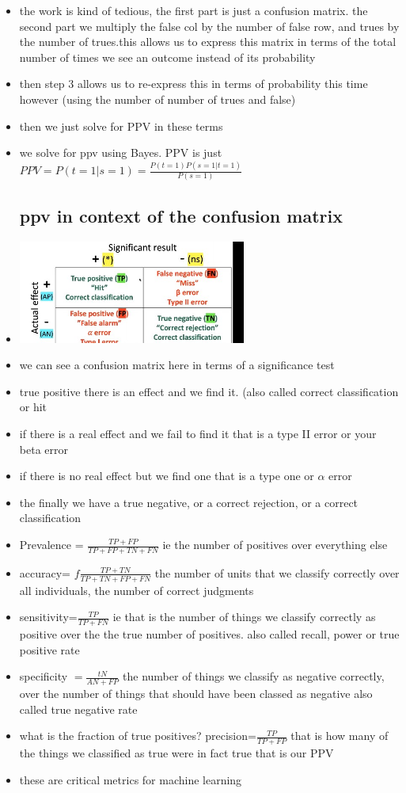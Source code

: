 \documentclass{article}
\begin{document}
\begin{itemize}
\item the work is kind of tedious, the first part is just a confusion matrix. the second part we multiply the false col by the number of false row, and trues by the number of trues.this allows us to express this matrix in terms of the total number of times we see an outcome instead of its probability
\item then step 3 allows us to re-express this in terms of probability this time however (using the number of number of trues and false) 
\item then we just solve for PPV in these terms 
\item we solve for ppv using Bayes. PPV is just $PPV=P(t=1|s=1)=\frac{P(t=1)P(s=1|t=1)}{P(s=1)}$
\subsection{ppv in context of the confusion matrix}
\item \includegraphics[width=7.5cm]{Final_Review/lecture_6/sigfgence_Test_confusion_matrix.jpg}
\item we can see a confusion matrix here in terms of a significance test 
\item true positive there is an effect and we find it. (also called correct classification or hit
\item if there is  a real effect and we fail to find it that is a type II error or your beta error 
\item if there is no real effect but we find one that is a type one or $\alpha$ error
\item the finally we have a true negative, or a correct rejection, or a correct classification 
\item Prevalence = $\frac{TP+FP}{TP+FP+TN+FN}$ ie the number of positives over everything else
\item accuracy= $f\frac{TP+TN}{TP+TN+FP+FN}$ the number of units that we classify correctly over all individuals, the number of correct judgments
\item sensitivity=$\frac{TP}{TP+FN}$ ie that is the number of things we classify correctly as positive over the the true number of positives. also called recall, power or true positive rate
\item specificity $=\frac{tN}{AN+FP}$ the number of things we classify as negative correctly, over the number of things that should have been classed as negative also called true negative rate
\item what is the fraction of true positives? precision=$\frac{TP}{TP+FP}$ that is how many of the things we classified as true were in fact true that is our PPV
\item these are critical metrics for machine learning 

\end{itemize}
\end{document}
